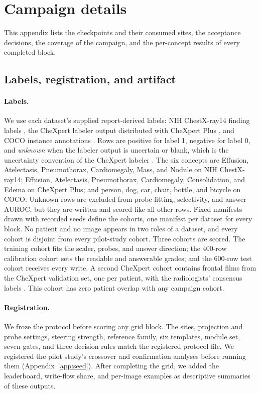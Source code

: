 \documentclass[11pt]{article}
\begin{document}


\appendix
\section{Campaign details}
\label{app:campaign}

This appendix lists the checkpoints and their consumed sites, the acceptance decisions, the coverage of the campaign, and the per-concept results of every completed block.

\subsection{Labels, registration, and artifact}
\label{app:cf-labels}

\paragraph{Labels.} We use each dataset's supplied report-derived labels: NIH ChestX-ray14 finding labels \citep{wang2017chestxray}, the CheXpert labeler output \citep{irvin2019chexpert} distributed with CheXpert Plus \citep{chambon2024chexpertplus}, and COCO instance annotations \citep{lin2014coco}. Rows are positive for label 1, negative for label 0, and \emph{unknown} when the labeler output is uncertain or blank, which is the uncertainty convention of the CheXpert labeler \citep{irvin2019chexpert}. The six concepts are Effusion, Atelectasis, Pneumothorax, Cardiomegaly, Mass, and Nodule on NIH ChestX-ray14; Effusion, Atelectasis, Pneumothorax, Cardiomegaly, Consolidation, and Edema on CheXpert Plus; and person, dog, car, chair, bottle, and bicycle on COCO. Unknown rows are excluded from probe fitting, selectivity, and answer AUROC, but they are written and scored like all other rows. Fixed manifests drawn with recorded seeds define the cohorts, one manifest per dataset for every block. No patient and no image appears in two roles of a dataset, and every cohort is disjoint from every pilot-study cohort. Three cohorts are scored. The training cohort fits the scaler, probes, and answer direction; the 400-row calibration cohort sets the readable and answerable grades; and the 600-row test cohort receives every write. A second CheXpert cohort contains \cfValidRows{} frontal films from the CheXpert validation set, one per patient, with the radiologists' consensus labels \citep{irvin2019chexpert}. This cohort has zero patient overlap with any campaign cohort.

\paragraph{Registration.} We froze the protocol before scoring any grid block. The sites, projection and probe settings, steering strength, reference family, six templates, module set, seven gates, and three decision rules match the registered protocol file. We registered the pilot study's crossover and confirmation analyses before running them (Appendix~\ref{app:seed}). After completing the grid, we added the leaderboard, write-flow share, and per-image examples as descriptive summaries of these outputs.
\end{document}
